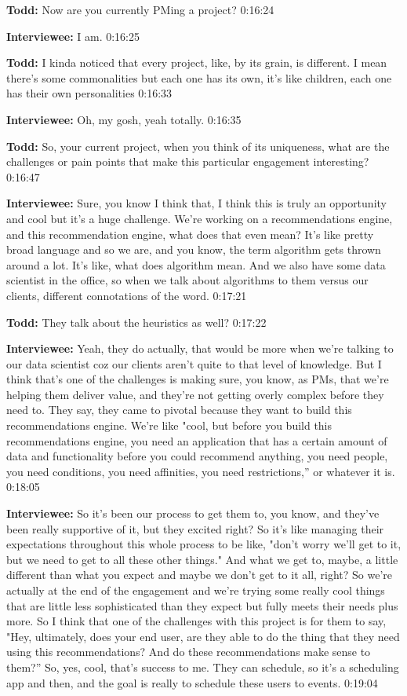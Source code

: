 \textbf{Todd:} Now are you currently PMing a project?   0:16:24

\textbf{Interviewee:} I am.   0:16:25

\textbf{Todd:} I kinda noticed that every project, like, by its grain, is different.  I mean there's some commonalities but each one has its own, it's like children, each one has their own personalities   0:16:33

\textbf{Interviewee:} Oh, my gosh, yeah totally.   0:16:35

\textbf{Todd:} So, your current project, when you think of its uniqueness, what are the challenges or pain points that make this particular engagement interesting?   0:16:47

\textbf{Interviewee:} Sure, you know I think that, I think this is truly an opportunity and cool but it's a huge challenge.  We're working on a recommendations engine, and this recommendation engine, what does that even mean?  It's like pretty broad language and so we are, and you know, the term algorithm gets thrown around a lot.  It's like, what does algorithm mean.  And we also have some data scientist in the office, so when we talk about algorithms to them versus our clients, different connotations of the word.   0:17:21

\textbf{Todd:} They talk about the heuristics as well?   0:17:22

\textbf{Interviewee:} Yeah, they do actually, that would be more when we're talking to our data scientist coz our clients aren't quite to that level of knowledge.  But I think that's one of the challenges is making sure, you know, as PMs, that we're helping them deliver value, and they're not getting overly complex before they need to.  They say, they came to pivotal because they want to build this recommendations engine.  We're like "cool, but before you build this recommendations engine, you need an application that has a certain amount of data and functionality before you could recommend anything, you need people, you need conditions, you need affinities, you need restrictions,” or whatever it is.   0:18:05

\textbf{Interviewee:} So it's been our process to get them to, you know, and they've been really supportive of it, but they excited right?  So it's like managing their expectations throughout this whole process to be like, "don't worry we'll get to it, but we need to get to all these other things."  And what we get to, maybe, a little different than what you expect and maybe we don't get to it all, right?  So we're actually at the end of the engagement and we're trying some really cool things that are little less sophisticated than they expect but fully meets their needs plus more.  So I think that one of the challenges with this project is for them to say, "Hey, ultimately, does your end user, are they able to do the thing that they need using this recommendations?  And do these recommendations make sense to them?”  So, yes, cool, that's success to me.  They can schedule, so it's a scheduling app and then, and the goal is really to schedule these users to events.   0:19:04

